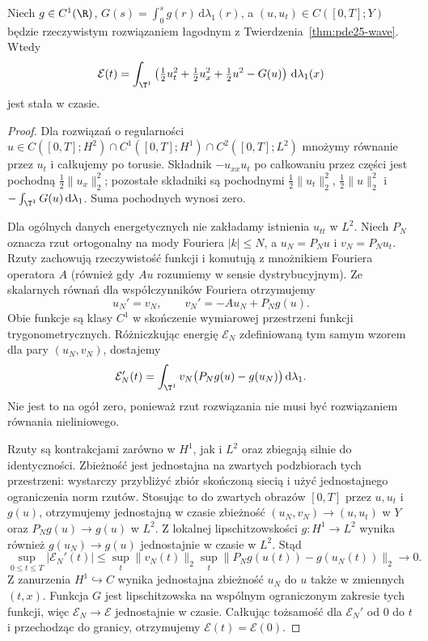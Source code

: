 \begin{stwierdzenie}
\label{prop:pde25-waveenergy}
Niech $g\in C^1(\R)$, $G(s)=\int_0^s g(r)\,\mathrm d\lambda_1(r)$,
a $(u,u_t)\in C([0,T];Y)$ będzie rzeczywistym
rozwiązaniem łagodnym z Twierdzenia~\ref{thm:pde25-wave}.
Wtedy
\[
 \mathcal E(t)=\int_{\T^1}\left(
 \tfrac12u_t^2+\tfrac12u_x^2+\tfrac12u^2-G(u)\right)
 \,\mathrm d\lambda_1(x)
\]
jest stała w czasie.
\end{stwierdzenie}
\begin{proof}
Dla rozwiązań o regularności
$u\in C([0,T];H^2)\cap C^1([0,T];H^1)
\cap C^2([0,T];L^2)$
mnożymy równanie przez $u_t$ i całkujemy po torusie.
Składnik $-u_{xx}u_t$ po całkowaniu przez części
jest pochodną $\tfrac12\|u_x\|_2^2$; pozostałe
składniki są pochodnymi $\tfrac12\|u_t\|_2^2$,
$\tfrac12\|u\|_2^2$ i
$-\int_{\T^1}G(u)\,\mathrm d\lambda_1$.
Suma pochodnych wynosi zero.

Dla ogólnych danych energetycznych nie zakładamy
istnienia $u_{tt}$ w $L^2$. Niech $P_N$ oznacza
rzut ortogonalny na mody Fouriera $|k|\le N$,
a $u_N=P_Nu$ i $v_N=P_Nu_t$.
Rzuty zachowują rzeczywistość funkcji i komutują
z mnożnikiem Fouriera operatora $A$ (również gdy
$Au$ rozumiemy w sensie dystrybucyjnym).
Ze skalarnych równań dla współczynników Fouriera
otrzymujemy
\[
 u_N'=v_N,\qquad v_N'=-Au_N+P_Ng(u).
\]
Obie funkcje są klasy $C^1$ w skończenie wymiarowej
przestrzeni funkcji trygonometrycznych. Różniczkując
energię $\mathcal E_N$ zdefiniowaną tym samym
wzorem dla pary $(u_N,v_N)$, dostajemy
\[
 \mathcal E_N'(t)=
 \int_{\T^1}v_N\bigl(P_Ng(u)-g(u_N)\bigr)
 \,\mathrm d\lambda_1 .
\]
Nie jest to na ogół zero, ponieważ rzut rozwiązania
nie musi być rozwiązaniem równania nieliniowego.

Rzuty są kontrakcjami zarówno w $H^1$, jak i $L^2$
oraz zbiegają silnie do identyczności. Zbieżność jest
jednostajna na zwartych podzbiorach tych przestrzeni:
wystarczy przybliżyć zbiór skończoną siecią i użyć
jednostajnego ograniczenia norm rzutów.
Stosując to do zwartych obrazów $[0,T]$ przez
$u,u_t$ i $g(u)$, otrzymujemy jednostajną w czasie
zbieżność $(u_N,v_N)\to(u,u_t)$ w $Y$ oraz
$P_Ng(u)\to g(u)$ w $L^2$.
Z lokalnej lipschitzowskości $g:H^1\to L^2$
wynika również $g(u_N)\to g(u)$ jednostajnie w czasie
w $L^2$. Stąd
\[
 \sup_{0\le t\le T}|\mathcal E_N'(t)|
 \le \sup_t\|v_N(t)\|_2
 \sup_t\|P_Ng(u(t))-g(u_N(t))\|_2\longrightarrow0.
\]
Z zanurzenia $H^1\hookrightarrow C$ wynika jednostajna
zbieżność $u_N$ do $u$ także w zmiennych $(t,x)$.
Funkcja $G$ jest lipschitzowska na wspólnym ograniczonym
zakresie tych funkcji, więc $\mathcal E_N\to\mathcal E$
jednostajnie w czasie. Całkując tożsamość dla
$\mathcal E_N'$ od $0$ do $t$ i przechodząc do granicy,
otrzymujemy $\mathcal E(t)=\mathcal E(0)$.
\end{proof}

